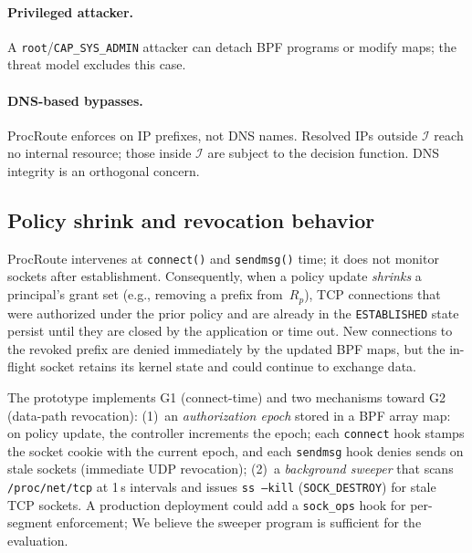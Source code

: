\documentclass[sigconf]{acmart}
\begin{document}
\paragraph{Privileged attacker.}
A \texttt{root}/\texttt{CAP\_SYS\_ADMIN} attacker can detach BPF
programs or modify maps; the threat model excludes this case.

\paragraph{DNS-based bypasses.}
ProcRoute enforces on IP prefixes, not DNS names.  Resolved IPs
outside $\mathcal{I}$ reach no internal resource; those inside
$\mathcal{I}$ are subject to the decision function.  DNS integrity
is an orthogonal concern.

\subsection{Policy shrink and revocation behavior}
\label{sec:revocation}

ProcRoute intervenes at \texttt{connect()} and
\texttt{sendmsg()} time; it does not monitor sockets after
establishment.
Consequently, when a policy update \emph{shrinks} a principal's
grant set (e.g., removing a prefix from~$R_p$), TCP connections
that were authorized under the prior policy and are already in
the \texttt{ESTABLISHED} state persist until they are closed by
the application or time out.
New connections to the revoked prefix are denied immediately by
the updated BPF maps, but the in-flight socket retains its
kernel state and could continue to exchange data.

The prototype implements G1 (connect-time) and two mechanisms
toward G2 (data-path revocation):
(1)~an \emph{authorization epoch} stored in a BPF array map: on
policy update, the controller increments the epoch; each
\texttt{connect} hook stamps the socket cookie with the current
epoch, and each \texttt{sendmsg} hook denies sends on stale
sockets (immediate UDP revocation);
(2)~a \emph{background sweeper} that scans \texttt{/proc/net/tcp}
at 1\,s intervals and issues \texttt{ss~--kill}
(\texttt{SOCK\_DESTROY}) for stale TCP sockets.
A production deployment could add a \texttt{sock\_ops} hook for
per-segment enforcement; We believe the sweeper program is
sufficient for the evaluation.
\end{document}
